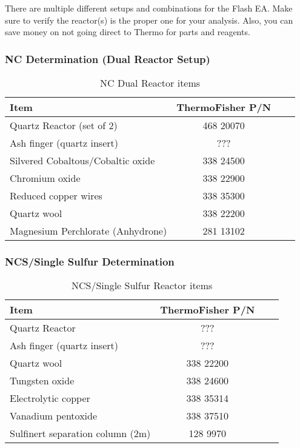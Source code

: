 \documentclass[12pt]{../SOP4_alpha}\usepackage[]{graphicx}\usepackage[]{color}
\begin{document}
\NP There are multiple different setups and combinations for the Flash EA. Make sure to verify the reactor(s) is the proper one for your analysis. Also, you can save money on not going direct to Thermo for parts and reagents.

\subsubsection{NC Determination (Dual Reactor Setup)}

\begin{table}[h]
\label{NC Dual Reactor item list}
\caption{NC Dual Reactor items}
\centering
\begin{tabular}{lccc} \hline
Item    & ThermoFisher P/N \\ \hline\hline
Quartz Reactor (set of 2)   & 468 20070 \\ 
Ash finger (quartz insert)    & ??? \\ 
Silvered Cobaltous/Cobaltic oxide   & 338 24500 \\ 
Chromium oxide    & 338 22900 \\ 
Reduced copper wires    & 338 35300 \\ 
Quartz wool   & 338 22200 \\ 
Magnesium Perchlorate (Anhydrone)   & 281 13102 \\ 
\end{tabular}
\end{table}

\subsubsection{NCS/Single Sulfur Determination}

\begin{table}[h]
\label{NCS/Single Sulfur Reactor item list}
\caption{NCS/Single Sulfur Reactor items}
\centering
\begin{tabular}{lccc} \hline
Item    & ThermoFisher P/N \\ \hline\hline
Quartz Reactor   & ??? \\ 
Ash finger (quartz insert)    & ??? \\ 
Quartz wool   & 338 22200 \\ 
Tungsten oxide    & 338 24600 \\ 
Electrolytic copper   & 338 35314 \\ 
Vanadium pentoxide   & 338 37510 \\ 
Sulfinert separation column (2m)   & 128 9970 \\ 
\end{tabular}
\end{table}
\end{document}

